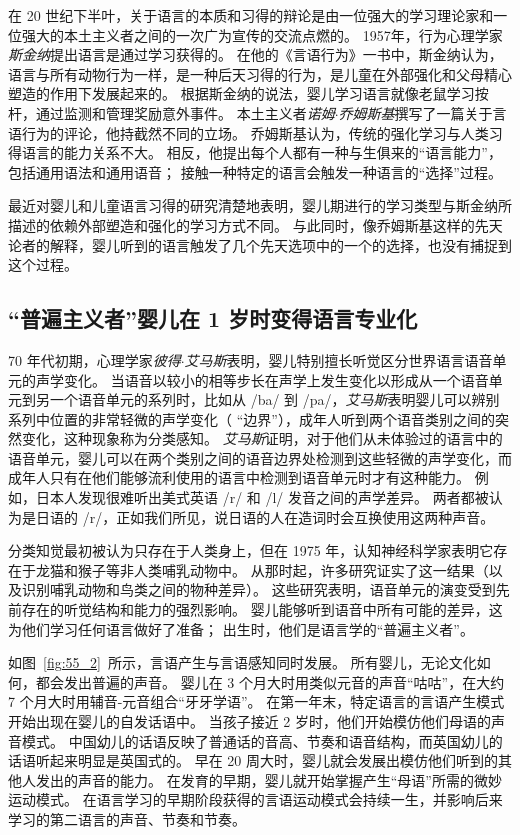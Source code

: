 在 20 世纪下半叶，关于语言的本质和习得的辩论是由一位强大的学习理论家和一位强大的本土主义者之间的一次广为宣传的交流点燃的。
1957年，行为心理学家\textit{斯金纳}提出语言是通过学习获得的。
在他的《言语行为》一书中，斯金纳认为，语言与所有动物行为一样，是一种后天习得的行为，是儿童在外部强化和父母精心塑造的作用下发展起来的。
根据斯金纳的说法，婴儿学习语言就像老鼠学习按杆，通过监测和管理奖励意外事件。
本土主义者\textit{诺姆$\cdot$乔姆斯基}撰写了一篇关于言语行为的评论，他持截然不同的立场。
乔姆斯基认为，传统的强化学习与人类习得语言的能力关系不大。
相反，他提出每个人都有一种与生俱来的“语言能力”，包括通用语法和通用语音；
接触一种特定的语言会触发一种语言的“选择”过程。


最近对婴儿和儿童语言习得的研究清楚地表明，婴儿期进行的学习类型与斯金纳所描述的依赖外部塑造和强化的学习方式不同。
与此同时，像乔姆斯基这样的先天论者的解释，婴儿听到的语言触发了几个先天选项中的一个的选择，也没有捕捉到这个过程。



\subsection{“普遍主义者”婴儿在 1 岁时变得语言专业化}

70 年代初期，心理学家\textit{彼得$\cdot$艾马斯}表明，婴儿特别擅长听觉区分世界语言语音单元的声学变化。
当语音以较小的相等步长在声学上发生变化以形成从一个语音单元到另一个语音单元的系列时，比如从 /ba/ 到 /pa/，\textit{艾马斯}表明婴儿可以辨别系列中位置的非常轻微的声学变化（ “边界”），成年人听到两个语音类别之间的突然变化，这种现象称为分类感知。
\textit{艾马斯}证明，对于他们从未体验过的语言中的语音单元，婴儿可以在两个类别之间的语音边界处检测到这些轻微的声学变化，而成年人只有在他们能够流利使用的语言中检测到语音单元时才有这种能力。
例如，日本人发现很难听出美式英语 /r/ 和 /l/ 发音之间的声学差异。
两者都被认为是日语的 /r/，正如我们所见，说日语的人在造词时会互换使用这两种声音。


分类知觉最初被认为只存在于人类身上，但在 1975 年，认知神经科学家表明它存在于龙猫和猴子等非人类哺乳动物中。
从那时起，许多研究证实了这一结果（以及识别哺乳动物和鸟类之间的物种差异）。
这些研究表明，语音单元的演变受到先前存在的听觉结构和能力的强烈影响。
婴儿能够听到语音中所有可能的差异，这为他们学习任何语言做好了准备；
出生时，他们是语言学的“普遍主义者”。


如图~\ref{fig:55_2}~所示，言语产生与言语感知同时发展。
所有婴儿，无论文化如何，都会发出普遍的声音。
婴儿在 3 个月大时用类似元音的声音“咕咕”，在大约 7 个月大时用辅音-元音组合“牙牙学语”。
在第一年末，特定语言的言语产生模式开始出现在婴儿的自发话语中。
当孩子接近 2 岁时，他们开始模仿他们母语的声音模式。
中国幼儿的话语反映了普通话的音高、节奏和语音结构，而英国幼儿的话语听起来明显是英国式的。
早在 20 周大时，婴儿就会发展出模仿他们听到的其他人发出的声音的能力。
在发育的早期，婴儿就开始掌握产生“母语”所需的微妙运动模式。
在语言学习的早期阶段获得的言语运动模式会持续一生，并影响后来学习的第二语言的声音、节奏和节奏。


